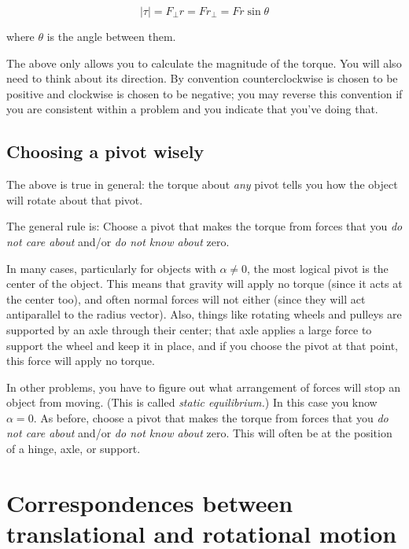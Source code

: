 \documentclass[10pt]{article}
\begin{document}
$$|\tau| = F_\perp r = F r_\perp = Fr \sin \theta$$

where $\theta$ is the angle between them.

The above only allows you to calculate the magnitude of the torque. You will also need to think about its direction. By convention counterclockwise is chosen to be positive and clockwise is chosen to be negative; you may reverse this convention if you are consistent within a problem and you indicate that you've doing that.

\subsection{Choosing a pivot wisely}

The above is true in general: the torque about {\it any} pivot tells you how the object will rotate about that pivot.

The general rule is: Choose a pivot that makes the torque from forces that you {\it do not care about} and/or {\it do not know about} zero.

In many cases, particularly for objects with $\alpha \neq 0$, the most logical pivot is the center of the object. This means that gravity will apply no torque (since it acts at the center too), and often normal forces will not either (since they will act antiparallel to the radius vector). Also, things like rotating wheels and pulleys are supported by an axle through their center; that axle applies a large force to support the wheel and keep it in place, and if you choose the pivot at that point, this force will apply no torque.

In other problems, you have to figure out what arrangement of forces will stop an object from moving. (This is called {\it static equilibrium.}) In this case you know $\alpha=0$. As before, choose a pivot that makes the torque from forces that you {\it do not care about} and/or {\it do not know about} zero. This will often be at the position of a hinge, axle, or support.


\section{Correspondences between translational and rotational motion}
\end{document}
